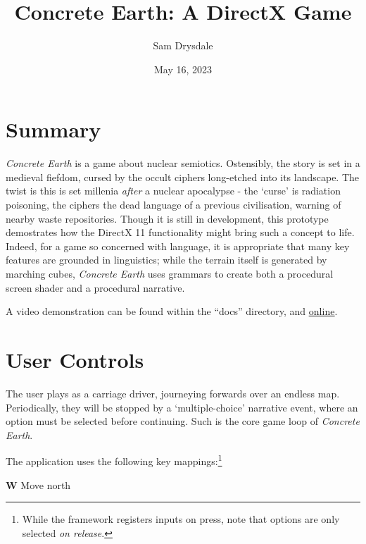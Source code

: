 \documentclass[a4paper, 11pt]{article}
\title{Concrete Earth: A DirectX Game}
\author{Sam Drysdale}
\date{May 16, 2023}
\begin{document}
\graphicspath{{./Images/}}
\maketitle
\tableofcontents
\begin{flushleft}

\section{Summary}

\textit{Concrete Earth} is a game about nuclear semiotics. Ostensibly, the story is set in a medieval fiefdom, cursed by the occult ciphers long-etched into its landscape. The twist is this is set millenia \textit{after} a nuclear apocalypse - the `curse' is radiation poisoning, the ciphers the dead language of a previous civilisation, warning of nearby waste repositories. Though it is still in development, this prototype demostrates how the DirectX 11 functionality might bring such a concept to life. Indeed, for a game so concerned with language, it is appropriate that many key features are grounded in linguistics; while the terrain itself is generated by marching cubes, \textit{Concrete Earth} uses grammars to create both a procedural screen shader and a procedural narrative.

\vspace{5pt}\noindent
A video demonstration can be found within the ``docs'' directory, and \href{https://www.youtube.com/watch?v=FbqZv7QruQ4&feature=youtu.be}{\ul{online}}. 

\newpage
\section{User Controls}

The user plays as a carriage driver, journeying forwards over an endless map. Periodically, they will be stopped by a `multiple-choice' narrative event, where an option must be selected before continuing. Such is the core game loop of \textit{Concrete Earth}.

\vspace{5pt}\noindent
The application uses the following key mappings:\footnote{While the framework registers inputs on press, note that options are only selected \textit{on release}.}

\begin{center}
\parbox[t]{0.75\textwidth}{
\vspace{0pt}\noindent 
\textbf{W} \dotfill{} Move north

}
\end{center}
\end{flushleft}
\end{document}
